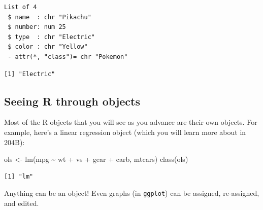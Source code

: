 \documentclass[
  letterpaper,
]{book}
\newenvironment{Shaded}{\begin{snugshade}}{\end{snugshade}}
\newcommand{\FunctionTok}[1]{\textcolor[rgb]{0.28,0.35,0.67}{#1}}
\newcommand{\NormalTok}[1]{\textcolor[rgb]{0.00,0.23,0.31}{#1}}
\newcommand{\OtherTok}[1]{\textcolor[rgb]{0.00,0.23,0.31}{#1}}
\newcommand{\SpecialCharTok}[1]{\textcolor[rgb]{0.37,0.37,0.37}{#1}}
\theoremstyle{definition}
\theoremstyle{definition}
\theoremstyle{plain}
\theoremstyle{definition}
\theoremstyle{plain}
\theoremstyle{plain}
\theoremstyle{remark}
\begin{document}
\begin{verbatim}
List of 4
 $ name  : chr "Pikachu"
 $ number: num 25
 $ type  : chr "Electric"
 $ color : chr "Yellow"
 - attr(*, "class")= chr "Pokemon"
\end{verbatim}

\begin{Shaded}
\end{Shaded}

\begin{verbatim}
[1] "Electric"
\end{verbatim}

\hypertarget{seeing-r-through-objects}{%
\subsection{Seeing R through objects}\label{seeing-r-through-objects}}

Most of the R objects that you will see as you advance are their own
objects. For example, here's a linear regression object (which you will
learn more about in 204B):

\begin{Shaded}
\begin{Highlighting}[]
\NormalTok{ols }\OtherTok{\textless{}{-}} \FunctionTok{lm}\NormalTok{(mpg }\SpecialCharTok{\textasciitilde{}}\NormalTok{ wt }\SpecialCharTok{+}\NormalTok{ vs }\SpecialCharTok{+}\NormalTok{ gear }\SpecialCharTok{+}\NormalTok{ carb, mtcars)}
\FunctionTok{class}\NormalTok{(ols)}
\end{Highlighting}
\end{Shaded}

\begin{verbatim}
[1] "lm"
\end{verbatim}

Anything can be an object! Even graphs (in \texttt{ggplot}) can be
assigned, re-assigned, and edited.
\end{document}
